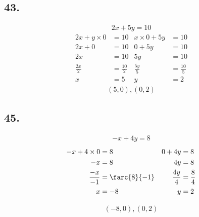 \documentclass{article}
\begin{document}
    \subsection*{43.}
    \begin{align*}
        2x + 5y = 10
    \end{align*}
    \begin{align*}
        2x + y \times 0 &= 10&x \times 0 + 5y &= 10 \\
        2x + 0 &=10 &0 + 5y &= 10\\
        2x &=10  &5y &= 10\\
        \frac{2x}{2} &= \frac{10}{2} &\frac{5y}{5} &= \frac{10}{5}\\
        x &=5 &y &=2
    \end{align*}
    \begin{align*}
        \boxed{(5,0), (0,2)}
    \end{align*}

    \subsection*{45.}
    \begin{align*}
        -x + 4y = 8
    \end{align*}
    \begin{align*}
        -x + 4 \times 0  &= 8&0 + 4y &= 8 \\
        -x &=8 &4y  &= 8\\
        \frac{-x}{-1}&= \farc{8}{-1}&\frac{4y}{4} &= \frac{8}{4}\\
        x&=-8&y &= 2
    \end{align*}
    \begin{align*}
        \boxed{(-8,0), (0,2)}
    \end{align*}
\end{document}
